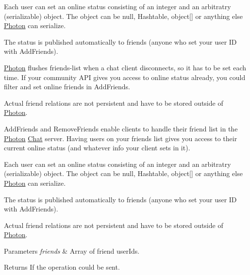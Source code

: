 Each user can set an online status consisting of an integer and an arbitratry (serializable) object. The object can be null, Hashtable, object\mbox{[}\mbox{]} or anything else \hyperlink{namespace_exit_games_1_1_client_1_1_photon}{Photon} can serialize.

The status is published automatically to friends (anyone who set your user ID with Add\+Friends).

\hyperlink{namespace_exit_games_1_1_client_1_1_photon}{Photon} flushes friends-\/list when a chat client disconnects, so it has to be set each time. If your community A\+PI gives you access to online status already, you could filter and set online friends in Add\+Friends.

Actual friend relations are not persistent and have to be stored outside of \hyperlink{namespace_exit_games_1_1_client_1_1_photon}{Photon}.

Add\+Friends and Remove\+Friends enable clients to handle their friend list in the \hyperlink{namespace_exit_games_1_1_client_1_1_photon}{Photon} \hyperlink{namespace_exit_games_1_1_client_1_1_photon_1_1_chat}{Chat} server. Having users on your friends list gives you access to their current online status (and whatever info your client sets in it).

Each user can set an online status consisting of an integer and an arbitratry (serializable) object. The object can be null, Hashtable, object\mbox{[}\mbox{]} or anything else \hyperlink{namespace_exit_games_1_1_client_1_1_photon}{Photon} can serialize.

The status is published automatically to friends (anyone who set your user ID with Add\+Friends).

Actual friend relations are not persistent and have to be stored outside of \hyperlink{namespace_exit_games_1_1_client_1_1_photon}{Photon}. 


\begin{DoxyParams}{Parameters}
{\em friends} & Array of friend user\+Ids.\\
\hline
\end{DoxyParams}
\begin{DoxyReturn}{Returns}
If the operation could be sent.
\end{DoxyReturn}

